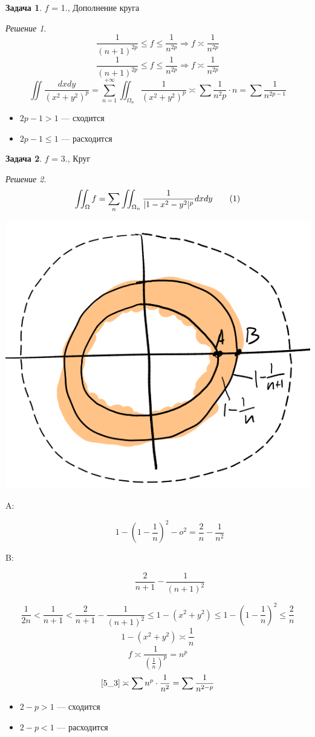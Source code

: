 \documentclass[english]{article}
\newcommand\addtag{\refstepcounter{equation}\tag{\theequation}}
\theoremstyle{plain}
\theoremstyle{remark}
\newtheorem*{solution}{Решение}
\theoremstyle{definition}
\newtheorem{task}{Задача}
\begin{document}
\begin{task}
\(f\) = 1., Дополнение круга
\end{task}
\begin{solution}
\[ \frac{1}{(n + 1)^{2p}} \le f \le \frac{1}{n^{2p}} \Rightarrow f \asymp \frac{1}{n^{2p}} \]
\[ \frac{1}{(n + 1)^{2p}} \le f \le \frac{1}{n^{2p}} \Rightarrow f \asymp \frac{1}{n^{2p}} \]
\[ \iint \frac{dx dy}{(x^2 + y^2)^p} = \sum_{n = 1}^{ + \infty} \iint_{\Omega_n} \frac{1}{(x^2 + y^2)^p} \asymp \sum \frac{1}{n^2 p} \cdot n = \sum \frac{1}{n^{2p - 1}} \]
\begin{itemize}
\item \(2p - 1 > 1\) --- сходится
\item \(2p - 1\le 1\) --- расходится
\end{itemize}
\end{solution}
\begin{task}
\(f\) = 3., Круг
\end{task}
\begin{solution}
\[ \iint_\Omega f = \sum_n \iint_{\Omega_n}\frac{1}{|1 - x^2 - y^2|^p} dx dy \addtag\label{5_3}\]
\begin{center}
\includegraphics[scale=0.4]{5_9.png}
\end{center}
\begin{description}
\item[{A:}] \[ 1 - (1 - \frac{1}{n})^2 - o^2 = \frac{2}{n} - \frac{1}{n^2} \]
\item[{B:}] \[ \frac{2}{n + 1} - \frac{1}{(n + 1)^2} \]
\end{description}
\[ \frac{1}{2n} < \frac{1}{n + 1} < \frac{2}{n + 1} - \frac{1}{(n + 1)^2} \le 1 - (x^2 + y^2) \le 1 - \left(1 - \frac{1}{n}\right)^2 \le \frac{2}{n} \]
\[ 1 - (x^2 + y^2) \asymp \frac{1}{n} \]
\[ f \asymp \frac{1}{\left(\frac{1}{n}\right)^p} = n^p \]
\[ \ref{5_3} \asymp \sum n^p\cdot\frac{1}{n^2} = \sum \frac{1}{n^{2 - p}} \]
\begin{itemize}
\item \(2 - p > 1\) --- сходится
\item \(2 - p < 1\) --- расходится
\end{itemize}
\end{solution}
\end{document}
